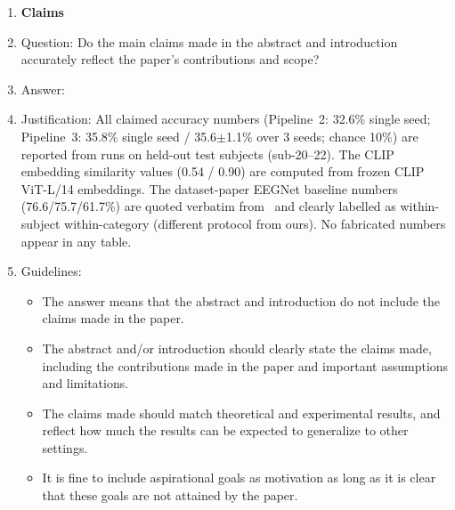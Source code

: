 \documentclass{article}
\begin{document}
\begin{enumerate}

\item {\bf Claims}
    \item[] Question: Do the main claims made in the abstract and introduction accurately reflect the paper's contributions and scope?
    \item[] Answer: \answerYes{}
    \item[] Justification: All claimed accuracy numbers (Pipeline~2: 32.6\% single seed; Pipeline~3: 35.8\% single seed / 35.6$\pm$1.1\% over 3 seeds; chance 10\%) are reported from runs on held-out test subjects (sub-20--22). The CLIP embedding similarity values (0.54 / 0.90) are computed from frozen CLIP ViT-L/14 embeddings. The dataset-paper EEGNet baseline numbers (76.6/75.7/61.7\%) are quoted verbatim from~\citep{figshare_paper} and clearly labelled as within-subject within-category (different protocol from ours). No fabricated numbers appear in any table.
    \item[] Guidelines:
    \begin{itemize}
        \item The answer \answerNA{} means that the abstract and introduction do not include the claims made in the paper.
        \item The abstract and/or introduction should clearly state the claims made, including the contributions made in the paper and important assumptions and limitations.
        \item The claims made should match theoretical and experimental results, and reflect how much the results can be expected to generalize to other settings.
        \item It is fine to include aspirational goals as motivation as long as it is clear that these goals are not attained by the paper.
    \end{itemize}


\end{enumerate}
\end{document}
